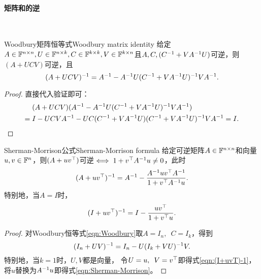 \paragraph{矩阵和的逆}

~

\begin{theorem}
	{Woodbury矩阵恒等式}{Woodbury matrix identity}
	给定$A\in\mathbb F^{n\times n},U\in\mathbb F^{n\times k},C\in\mathbb F^{k\times k},V\in\mathbb F^{k\times n}$且$A,C,(C^{-1}+VA^{-1} U)$可逆，则$(A+UCV)$可逆，且 
	\begin{equation}
		\label{eqn:Woodbury}
		(A+UCV)^{-1}=A^{-1}-A^{-1} U(C^{-1}+VA^{-1} U)^{-1} VA^{-1}.
	\end{equation}
\end{theorem}
\begin{proof}
	直接代入验证即可：
	\begin{align*}
		&(A+UCV)(A^{-1}-A^{-1} U(C^{-1}+VA^{-1} U)^{-1} VA^{-1})\\
		={}&I-UCVA^{-1}-UC(C^{-1}+VA^{-1} U)(C^{-1}+VA^{-1} U)^{-1} VA^{-1}=I.
		\qedhere
	\end{align*}
\end{proof}

\begin{theorem}
	{Sherman-Morrison公式}{Sherman-Morrison formula}
	给定可逆矩阵$A\in\mathbb F^{n\times n}$和向量$u,v\in\mathbb F^n$，则$(A+uv^\top)$可逆$\iff 1+v^\top A^{-1} u\neq 0$，此时
	\begin{equation}
		\label{eqn:Sherman-Morrison}
		(A+uv^\top)^{-1}=A^{-1}-\frac{A^{-1} uv^\top A^{-1}}{1+v^\top A^{-1} u}.
	\end{equation}
	特别地，当$A=I$时，
	\begin{equation}
		\label{eqn:(I+uvT)-1}
		(I+uv^\top)^{-1}=I-\frac{uv^\top}{1+v^\top u}.
	\end{equation}
\end{theorem}
\begin{proof}
	对Woodbury恒等式\eqref{eqn:Woodbury}取$A=I_n,\enspace C=I_k$，得到
	\begin{equation}
		\label{eqn:(I+UVT)-1}
		(I_n+UV)^{-1}=I_n-U(I_k+VU)^{-1} V.
	\end{equation}
	特别地，当$k=1$时，$U,V$都是向量，
	令$U=u,\enspace V=v^\top$即得式\eqref{eqn:(I+uvT)-1}，将$u$替换为$A^{-1} u$即得式\eqref{eqn:Sherman-Morrison}。
\end{proof}

